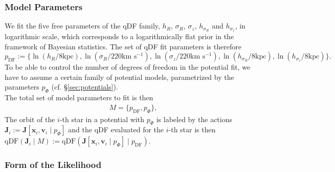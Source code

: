 \documentclass[12pt,preprint]{aastex}
\newcommand{\vect}[1]{\boldsymbol{#1}} %
\begin{document}
\subsubsection{Model Parameters} \label{kap:modpar}

We fit the five free parameters of the qDF family, $h_R$, $\sigma_R$, $\sigma_z$, $h_{\sigma_R}$ and $h_{\sigma_z}$, in logarithmic scale, which corresponds to a logarithmically flat prior in the framework of Bayesian statistics. The set of qDF fit parameters is therefore 
\begin{equation*}
p_\text{DF} := \{ \ln \left(h_R/8\text{kpc}\right), \ln \left(\sigma_R/220\text{km s$^{-1}$}\right), \ln \left(\sigma_z/220\text{km s$^{-1}$}\right), \ln \left(h_{\sigma_R}/8\text{kpc}\right), \ln \left(h_{\sigma_z}/8\text{kpc}\right)\} .
\end{equation*}
To be able to control the number of degrees of freedom in the potential fit, we have to assume a certain family of potential models, parametrized by the parameters $p_\Phi$ (cf. \S\ref{sec:potentials}). 
\\The total set of model parameters to fit is then
\begin{eqnarray*}
M =\{ p_\text{DF} , p_\Phi \},
\end{eqnarray*}
The orbit of the $i$-th star in a potential with $p_\Phi$ is labeled by the actions $\vect{J}_i := \vect{J}[\vect{x}_i,\vect{v}_i\mid p_{\Phi}]$ and the qDF evaluated for the $i$-th star is then $\text{qDF}(\vect{J}_i \mid M) := \text{qDF}(\vect{J}[\vect{x}_i,\vect{v}_i\mid p_{\Phi}] \mid p_\text{DF})$.

\subsubsection{Form of the Likelihood} 
\end{document}
